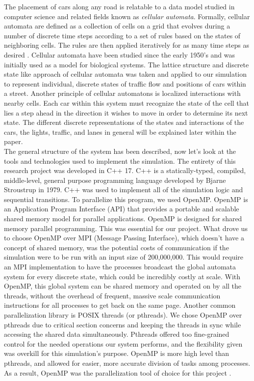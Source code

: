 \documentclass[conference]{IEEEtran}
\begin{document}
The placement of cars along any road is relatable to a data model studied in computer science and related fields known as \textit{cellular automata}. Formally, cellular automata are defined as a collection of cells on a grid that evolves during a number of discrete time steps according to a set of rules based on the states of neighboring cells. The rules are then applied iteratively for as many time steps as desired \cite{WolframCellularAutomaton}. Cellular automata have been studied since the early 1950’s and was initially used as a model for biological systems. The lattice structure and discrete state like approach of cellular automata was taken and applied to our simulation to represent individual, discrete states of traffic flow and positions of cars within a street.  Another principle of cellular automatons is localized interactions with nearby cells.  Each car within this system must recognize the state of the cell that lies a step ahead in the direction it wishes to move in order to determine its next state. The different discrete representations of the states and interactions of the cars, the lights, traffic, and lanes in general will be explained later within the paper. \\

The general structure of the system has been described, now let’s look at the tools and technologies used to implement the simulation. The entirety of this research project was developed in C++ 17.  C++ is a statically-typed, compiled, middle-level, general purpose programming language developed by Bjarne Stroustrup in 1979.  C++ was used to implement all of the simulation logic and sequential transitions.  To parallelize this program, we used OpenMP. OpenMP is an Application Program Interface (API) that provides a portable and scalable shared memory model for parallel applications. OpenMP is designed for shared memory parallel programming. This was essential for our project.  What drove us to choose OpenMP over MPI (Message Passing Interface), which doesn’t have a concept of shared memory, was the potential costs of communication if the simulation were to be run with an input size of 200,000,000.  This would require an MPI implementation to have the processes broadcast the global automata system for every discrete state, which could be incredibly costly at scale.  With OpenMP, this global system can be shared memory and operated on by all the threads, without the overhead of frequent, massive scale communication instructions for all processes to get back on the same page. Another common parallelization library is POSIX threads (or pthreads). We chose OpenMP over pthreads due to critical section concerns and keeping the threads in sync while accessing the shared data simultaneously.  Pthreads offered too fine-grained control for the needed operations our system performs, and the flexibility given was overkill for this simulation's purpose.  OpenMP is more high level than pthreads, and allowed for easier, more accurate division of tasks among processes. As a result, OpenMP was the parallelization tool of choice for this project . \cite{openmp} \\
\end{document}
